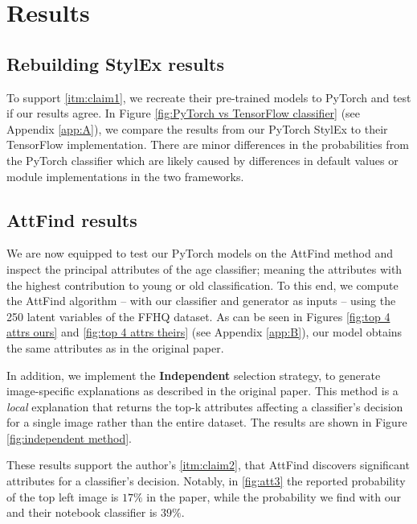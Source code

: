 \section{Results}
\label{sec:results}

\subsection{Rebuilding StylEx results}

To support \ref{itm:claim1}, we recreate their pre-trained models to PyTorch and test if our results agree. In Figure \ref{fig:PyTorch vs TensorFlow classifier} (see Appendix \ref{app:A}), we compare the results from our PyTorch StylEx to their TensorFlow implementation. There are minor differences in the probabilities from the PyTorch classifier which are likely caused by differences in default values or module implementations in the two frameworks.

\subsection{AttFind results}

We are now equipped to test our PyTorch models on the AttFind method and inspect the principal attributes of the age classifier; meaning the attributes with the highest contribution to young or old classification. To this end, we compute the AttFind algorithm -- with our classifier and generator as inputs -- using the 250 latent variables of the FFHQ dataset. As can be seen in Figures \ref{fig:top 4 attrs ours} and \ref{fig:top 4 attrs theirs} (see Appendix \ref{app:B}), our model obtains the same attributes as in the original paper.

In addition, we implement the \textbf{Independent} selection strategy, to generate image-specific explanations as described in the original paper. This method is a \textit{local} explanation that returns the top-k attributes affecting a classifier's decision for a single image rather than the entire dataset. The results are shown in Figure \ref{fig:independent method}.

These results support the author's \ref{itm:claim2}, that AttFind discovers significant attributes for a classifier's decision. Notably, in \ref{fig:att3} the reported probability of the top left image is $17\%$ in the paper, while the probability we find with our and their notebook classifier is $39\%$.

